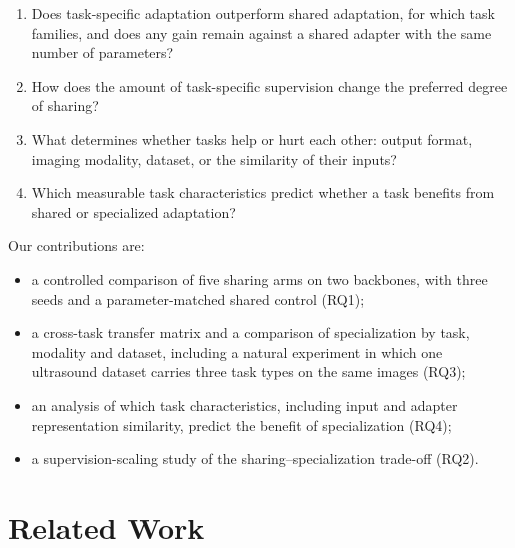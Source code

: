 \documentclass[journal,twoside,web]{ieeecolor}
\begin{document}
\begin{enumerate}[label=\textbf{RQ\arabic*.}]
    \item Does task-specific adaptation outperform shared adaptation, for
    which task families, and does any gain remain against a shared adapter
    with the same number of parameters?

    \item How does the amount of task-specific supervision change the
    preferred degree of sharing?

    \item What determines whether tasks help or hurt each other: output
    format, imaging modality, dataset, or the similarity of their inputs?

    \item Which measurable task characteristics predict whether a task
    benefits from shared or specialized adaptation?
\end{enumerate}

Our contributions are:
\begin{itemize}
    \item a controlled comparison of five sharing arms on two backbones, with
    three seeds and a parameter-matched shared control (RQ1);
    \item a cross-task transfer matrix and a comparison of specialization by
    task, modality and dataset, including a natural experiment in which one
    ultrasound dataset carries three task types on the same images (RQ3);
    \item an analysis of which task characteristics, including input and
    adapter representation similarity, predict the benefit of
    specialization (RQ4);
    \item a supervision-scaling study of the sharing--specialization
    trade-off (RQ2).
\end{itemize}


\section{Related Work}
\label{sec:related}
\end{document}
